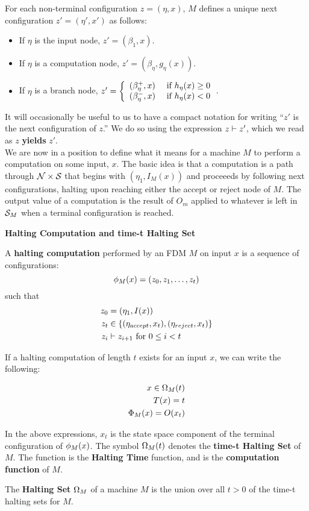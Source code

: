 For each non-terminal configuration $z = (\eta, x)$, $M$ defines a
unique next configuration $z' = (\eta', x')$ as follows:

\begin{itemize}
\item If $\eta$ is the input node, $z' = (\beta_{1}, x)$.
\item If $\eta$ is a computation node, $z' = (\beta_{\eta}, g_\eta(x))$.
\item If $\eta$ is a branch node, $z' = \left\{ \begin{array}{ll} (\beta_\eta^+,x) & \text{ if } h_\eta(x) \geq 0 \\ (\beta_\eta^-, x) & \text{ if } h_\eta(x) < 0 \end{array} \right.$.
\end{itemize}

It will occasionally be useful to us to have a compact notation for
writing ``$z'$ is the next configuration of $z$.''  We do so using the
expression $z \vdash z'$, which we read as $z$ \textbf{yields} $z'$.\\

We are now in a position to define what it means for a machine $M$ to
perform a computation on some input, $x$.  The basic idea is that a
computation is a path through $\mathcal{N} \times \mathcal{S}$ that begins
with $(\eta_1, I_M(x))$ and proceeeds by following next
configurations, halting upon reaching either the accept or reject node
of $M$.  The output value of a computation is the result of $O_m$
applied to whatever is left in $\mathcal{S}_M$ when a terminal
configuration is reached.\\

\begin{definition}{\textbf{Halting Computation and time-t Halting Set}}

  A \textbf{halting computation} performed by an FDM $M$ on input $x$
  is a sequence of configurations: 
  $$\phi_M(x) = (z_0, z_1, \ldots, z_t)$$ such that
  \begin{align*}
    z_0 &= (\eta_1, I(x))\\
    z_t &\in \{(\eta_{accept}, x_t), (\eta_{reject}, x_t)\}\\
    z_i &\vdash z_{i+1} \text{ for } 0 \leq i < t
  \end{align*}
  
  If a halting computation of length $t$ exists for an input $x$, we
  can write the following:

  \begin{align*}
    x \in \Omega_M(t)\\
    T(x) = t\\
    \Phi_M(x) = O(x_t)
  \end{align*}

  In the above expressions, $x_t$ is the state space component of the
  terminal configuration of $\phi_M(x)$.  The symbol
  $\Omega_M(t)$ denotes the \textbf{time-t Halting Set} of $M$.  The
  function  is the \textbf{Halting
    Time} function, and
   is the
  \textbf{computation function} of $M$.  

  The \textbf{Halting Set} $\Omega_M$ of a machine $M$ is the union
  over all $t > 0$ of the time-t halting sets for $M$.

\end{definition}

